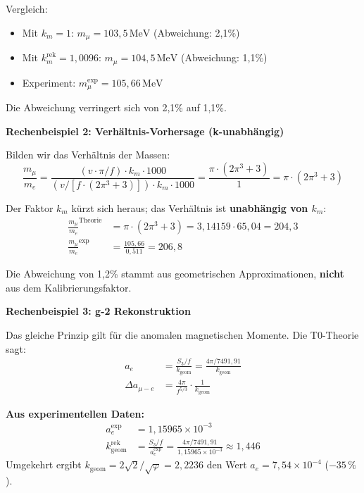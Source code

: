 	Vergleich:
	\begin{itemize}
		\item Mit \(k_m = 1\): \(m_\mu = 103{,}5\,\text{MeV}\) (Abweichung: 2{,}1\%)
		\item Mit \(k_m^{\text{rek}} = 1{,}0096\): \(m_\mu = 104{,}5\,\text{MeV}\) (Abweichung: 1{,}1\%)
		\item Experiment: \(m_\mu^{\exp} = 105{,}66\,\text{MeV}\)
	\end{itemize}
	
	Die Abweichung verringert sich von 2{,}1\% auf 1{,}1\%.
	
	\textbf{Rechenbeispiel 2: Verhältnis-Vorhersage (k-unabhängig)}
	
	Bilden wir das Verhältnis der Massen:
	\begin{equation}
		\frac{m_\mu}{m_e} = \frac{(v \cdot \pi / f) \cdot k_m \cdot 1000}{(v / [f \cdot (2\pi^3 + 3)]) \cdot k_m \cdot 1000} = \frac{\pi \cdot (2\pi^3 + 3)}{1} = \pi \cdot (2\pi^3 + 3)
	\end{equation}
	
	Der Faktor \(k_m\) kürzt sich heraus; das Verhältnis ist \textbf{unabhängig von \(k_m\)}:
	\begin{align}
		\frac{m_\mu}{m_e}^{\text{Theorie}} &= \pi \cdot (2\pi^3 + 3) = 3{,}14159 \cdot 65{,}04 = 204{,}3 \\
		\frac{m_\mu}{m_e}^{\exp} &= \frac{105{,}66}{0{,}511} = 206{,}8
	\end{align}
	
	Die Abweichung von 1{,}2\% stammt aus geometrischen Approximationen, \textbf{nicht} aus dem Kalibrierungsfaktor.
	
	\textbf{Rechenbeispiel 3: g-2 Rekonstruktion}
	
	Das gleiche Prinzip gilt für die anomalen magnetischen Momente. Die T0-Theorie sagt:
	\begin{align}
		a_e &= \frac{S_3/f}{k_{\text{geom}}} = \frac{4\pi/7491{,}91}{k_{\text{geom}}} \\
		\Delta a_{\mu-e} &= \frac{4\pi}{f^{5/3}} \cdot \frac{1}{k_{\text{geom}}}
	\end{align}
	
	\textbf{Aus experimentellen Daten:}
	\begin{align}
		a_e^{\exp} &= 1{,}15965 \times 10^{-3} \\
		k_{\text{geom}}^{\text{rek}} &= \frac{S_3/f}{a_e^{\exp}} = \frac{4\pi/7491{,}91}{1{,}15965 \times 10^{-3}} \approx 1{,}446
	\end{align}
	Umgekehrt ergibt $k_\text{geom} = 2\sqrt{2}/\sqrt{\varphi} = 2{,}2236$ den Wert $a_e = 7{,}54\times10^{-4}$ ($-35\,\%$).
	
